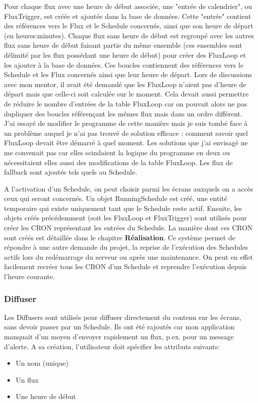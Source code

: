 \documentclass[french]{article}
\begin{document}
Pour chaque flux avec une heure de début associée, une "entrée de calendrier", ou FluxTrigger, est créée et ajoutée dans la base de données. Cette "entrée" contient des références vers le Flux et le Schedule concernés, ainsi que son heure de départ (en heures:minutes).\newline
Chaque flux sans heure de début est regroupé avec les autres flux sans heure de début faisant partie du même ensemble (ces ensembles sont délimité par les flux possédant une heure de début) pour créer des FluxLoop et les ajouter à la base de données. Ces boucles contiennent des références vers le Schedule et les Flux concernés ainsi que leur heure de départ. Lors de discussions avec mon mentor, il avait été demandé que les FluxLoop n'aient pas d'heure de départ mais que celle-ci soit calculée sur le moment. Cela devait aussi permettre de réduire le nombre d'entrées de la table FluxLoop car on pouvait alors ne pas dupliquer des boucles référençant les mêmes flux mais dans un ordre différent. J'ai essayé de modifier le programme de cette manière mais je suis tombé face à un problème auquel je n'ai pas trouvé de solution efficace : comment savoir quel FluxLoop devait être démarré à quel moment. Les solutions que j'ai envisagé ne me convenait pas car elles scindaient la logique du programme en deux ou nécessitaient elles aussi des modifications de la table FluxLoop. \newline
Les flux de fallback sont ajoutés tels quels au Schedule.\newline

A l'activation d'un Schedule, on peut choisir parmi les écrans auxquels on a accès ceux qui seront concernés. Un objet RunningSchedule est créé, une entité temporaire qui existe uniquement tant que le Schedule reste actif. 
Ensuite, les objets créés précédemment (soit les FluxLoop et FluxTrigger) sont utilisés pour créer les CRON représentant les entrées du Schedule. La manière dont ces CRON sont créés est détaillée dans le chapitre \textbf{Réalisation}.\newline 
Ce système permet de répondre à une autre demande du projet, la reprise de l'exécution des Schedules actifs lors du redémarrage du serveur ou après une maintenance. On peut en effet facilement recréer tous les CRON d'un Schedule et reprendre l'exécution depuis l'heure courante.


\subsubsection{Diffuser}
Les Diffusers sont utilisés pour diffuser directement du contenu sur les écrans, sans devoir passer par un Schedule. Ils ont été rajoutés car mon application manquait d'un moyen d'envoyer rapidement un flux, p.ex. pour un message d'alerte. \newline
A sa création, l'utilisateur doit spécifier les attributs suivants:
\begin{itemize}
	\item Un nom (unique)
	\item Un flux
	\item Une heure de début
\end{itemize}
\end{document}
